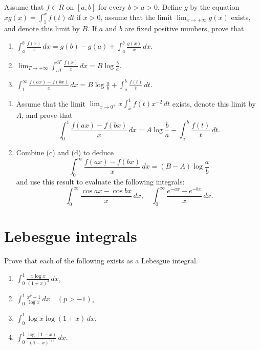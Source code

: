 \begin{problembox}
Assume that $f \in R$ on $[a, b]$ for every $b > a > 0$. Define $g$ by the equation $xg(x) = \int_{1}^{x} f(t) \, dt$ if $x > 0$, assume that the limit $\lim_{x \to +\infty} g(x)$ exists, and denote this limit by $B$. If $a$ and $b$ are fixed positive numbers, prove that
\begin{enumerate}[label=(\alph*)]
    \item $\int_{a}^{b} \frac{f(x)}{x} \, dx = g(b) - g(a) + \int_{a}^{b} \frac{g(x)}{x} \, dx.$
    \item $\lim_{T \to +\infty} \int_{aT}^{bT} \frac{f(x)}{x} \, dx = B \log \frac{b}{a}.$
    \item $\int_{1}^{\infty} \frac{f(ax) - f(bx)}{x} \, dx = B \log \frac{a}{b} + \int_{a}^{b} \frac{f(t)}{t} \, dt.$
\end{enumerate}
\begin{enumerate}[label=(\alph*),resume]
    \item Assume that the limit $\lim_{x \to 0^+} x \int_{x}^{1} f(t)x^{-2} \, dt$ exists, denote this limit by $A$, and prove that
    \[\int_{0}^{1} \frac{f(ax) - f(bx)}{x} \, dx = A \log \frac{b}{a} - \int_{a}^{b} \frac{f(t)}{t} \, dt.\]
    \item Combine (c) and (d) to deduce
    \[\int_{0}^{\infty} \frac{f(ax) - f(bx)}{x} \, dx = (B - A) \log \frac{a}{b}\]
    and use this result to evaluate the following integrals:
    \[\int_{0}^{\infty} \frac{\cos ax - \cos bx}{x} \, dx, \quad \int_{0}^{\infty} \frac{e^{-ax} - e^{-bx}}{x} \, dx.\]
\end{enumerate}
\end{problembox}

\section{Lebesgue integrals}

\begin{problembox}
Prove that each of the following exists as a Lebesgue integral.
\begin{enumerate}[label=(\alph*)]
    \item $\int_{0}^{1} \frac{x \log x}{(1 + x)^2} \, dx$,
    \item $\int_{0}^{1} \frac{x^p - 1}{\log x} \, dx \quad (p > -1)$,
    \item $\int_{0}^{1} \log x \log (1 + x) \, dx$,
    \item $\int_{0}^{1} \frac{\log (1 - x)}{(1 - x)^{1/2}} \, dx.$
\end{enumerate}
\end{problembox}


